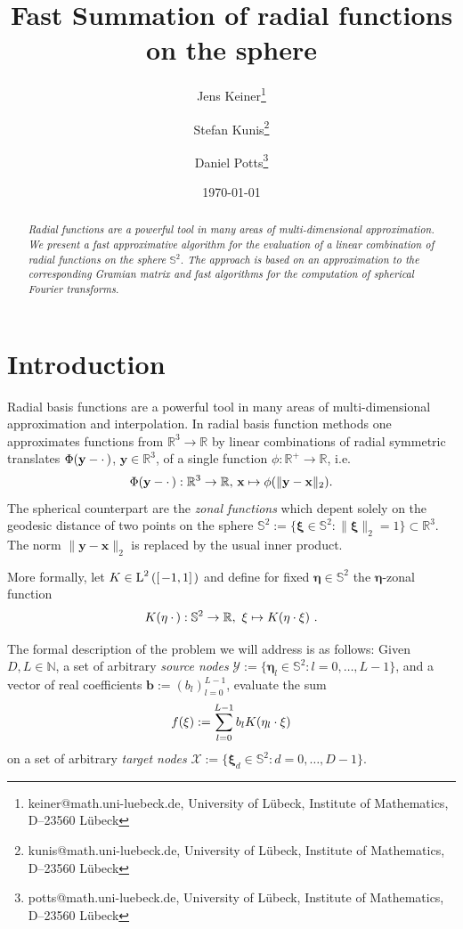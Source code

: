 \documentclass[11pt,a4paper,twoside,bibtotoc]{scrartcl}
\title{
Fast Summation of radial functions on the sphere}
\date{\today}
\author{
Jens Keiner\thanks{keiner@math.uni-luebeck.de, University of
  L\"ubeck, Institute of Mathematics, D--23560 L\"ubeck} \and
Stefan Kunis\thanks{kunis@math.uni-luebeck.de, University of
  L\"ubeck, Institute of Mathematics, D--23560 L\"ubeck} \and
Daniel Potts\thanks{potts@math.uni-luebeck.de, University of
  L\"ubeck, Institute of Mathematics, D--23560 L\"ubeck} 
}
\theoremstyle{plain}
\theoremstyle{definition}
\theoremstyle{remark}
\newcommand{\N}{\ensuremath{\mathbb{N}}}
\newcommand{\R}{\ensuremath{\mathbb{R}}}
\newcommand{\twosphere}{\ensuremath{\mathbb{S}^2}}
\newcommand{\Ln}[2]{\ensuremath{\text{\rm{L}}^{#1}\left(#2\right)}}
\newcommand{\interv}[4]{\ensuremath{\left#1\left.#2,#3\right#4\right.}}
\newcommand{\fun}[2]{\ensuremath{#1{\hspace{-0.4ex}}\left(#2\right)}}
\newcommand{\mb}[1]{\mathbf{#1}}
\newcommand{\V}[1]{\mb{#1}}
\numberwithin{equation}{section}
\numberwithin{table}{section}
\numberwithin{figure}{section}
\begin{document}
\maketitle

\begin{abstract}
\medskip


\noindent
{\it Radial functions are a powerful tool in many areas of multi-dimensional 
approximation. We present a fast approximative algorithm for the evaluation of
a linear combination of radial functions on the sphere $\mathbb{S}^2$. The 
approach is based on an approximation to the corresponding Gramian matrix
and fast algorithms for the computation of spherical Fourier transforms.}
\end{abstract}


\section{Introduction}\label{sect:1}

Radial basis functions are a powerful tool in many areas of multi-dimensional 
approximation and interpolation.
In radial basis function methods one approximates functions from $\R^3
\rightarrow \R$ by linear combinations of radial symmetric translates 
$\fun{\Phi}{\V{y} - \cdot \,}$, $\V{y} \in \R^3$, of a single function $\phi : \R^{+} \rightarrow \R$, i.e. 
\[
  \fun{\Phi}{\V{y} - \cdot \,}:\R^3 \rightarrow \R, \, \V{x} \mapsto \phi(\|\V{y} - \V{x}\|_2).
\]
The spherical counterpart are the \emph{zonal functions} which depent solely
on the geodesic distance of two points on the sphere $\twosphere:=\{
\V{\xi} \in \twosphere: \|\V{\xi}\|_2=1\} \subset \R^3$. The norm $\|\V{y} - \V{x}\|_2$ 
is replaced by the usual inner product.

More formally, let $K \in \Ln{2}{\interv{[}{-1}{1}{]}}$ and define for fixed
$\V{\eta} \in \twosphere$ the $\V{\eta}$-zonal function 
\[
  \fun{K}{\V{\eta} \: \cdot \,}: \twosphere \rightarrow \R,\ \V{\xi} \mapsto
  \fun{K}{\V{\eta} \cdot \V{\xi}}\,.%
\]

The formal description of the problem we will address is as follows:
Given $D,L \in \N$, a set of arbitrary \emph{source nodes} $\mathcal{Y} :=
\{\V{\eta}_{l} \in \twosphere: l = 0,\ldots,L-1\}$, and a vector of
real coefficients $\V{b}:=(b_{l})_{l=0}^{L-1}$, evaluate the sum
\begin{equation}
  \label{Applications:KernelSum}
  \fun{f}{\V{\xi}} := \sum_{l = 0}^{L-1} b_{l} \fun{K}{\V{\eta}_{l} \cdot \V{\xi}}
\end{equation}
on a set of arbitrary \emph{target nodes} $\mathcal{X} := \{\V{\xi}_{d}
  \in \twosphere: d=0,\ldots,D-1\}$.
\end{document}
